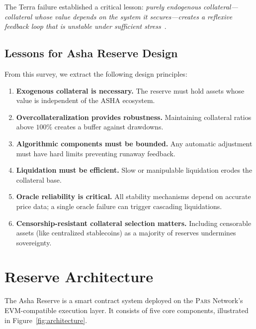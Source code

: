 \documentclass[11pt,a4paper]{article}
\newcommand{\Pars}{\textsc{Pars}\xspace}
\newcommand{\asha}{\textsc{ASHA}\xspace}
\begin{document}
The Terra failure established a critical lesson: \emph{purely endogenous collateral---collateral whose value depends on the system it secures---creates a reflexive feedback loop that is unstable under sufficient stress}~\citep{clements2021}.

\subsection{Lessons for Asha Reserve Design}

From this survey, we extract the following design principles:

\begin{enumerate}
  \item \textbf{Exogenous collateral is necessary.} The reserve must hold assets whose value is independent of the \asha ecosystem.
  \item \textbf{Overcollateralization provides robustness.} Maintaining collateral ratios above $100\%$ creates a buffer against drawdowns.
  \item \textbf{Algorithmic components must be bounded.} Any automatic adjustment must have hard limits preventing runaway feedback.
  \item \textbf{Liquidation must be efficient.} Slow or manipulable liquidation erodes the collateral base.
  \item \textbf{Oracle reliability is critical.} All stability mechanisms depend on accurate price data; a single oracle failure can trigger cascading liquidations.
  \item \textbf{Censorship-resistant collateral selection matters.} Including censorable assets (like centralized stablecoins) as a majority of reserves undermines sovereignty.
\end{enumerate}

\section{Reserve Architecture}
\label{sec:architecture}

The Asha Reserve is a smart contract system deployed on the \Pars Network's EVM-compatible execution layer.
It consists of five core components, illustrated in Figure~\ref{fig:architecture}.
\end{document}
